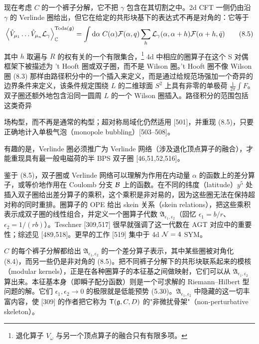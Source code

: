  现在考虑 $C$ 的一个裤子分解，它不把 $\gamma$ 包含在其切割之中。2d CFT 一侧仍由沿 $\gamma$ 的 Verlinde 圈给出，但它在给定的共形块基下的表达式不再是对角的：它等于
\begin{equation}
    \left\langle\hat V_{\mu_1}\ldots\hat V_{\mu_n}\mathcal{L}_\gamma\right\rangle^{\mathrm{Toda}(\mathfrak{g})}_{\mathbb{C}}
    =\int\mathrm{d}\alpha\;C(\alpha)\mathcal{F}(\alpha,q)\sum_h\mathcal{L}_\gamma(\alpha,\alpha+h)\mathcal{F}(\alpha+h,\bar q)
    \tag{8.5}
\end{equation}
其中 $h$ 取遍与 $R$ 的权有关的一个有限集合，\footnote{退化算子 $V_\omega$ 与另一个顶点算子的融合只有有限多项。} 4d 中相应的圈算子在这个 S 对偶框架下被描述为 't Hooft 圈或双子圈，而不是 Wilson 圈。't Hooft 圈不像 Wilson 圈 (8.3) 那样由路径积分中的一个插入来定义，而是通过给规范场强加一个奇异的边界条件来定义，该条件规定围绕 $L$ 的二维球面 $S^2$ 上具有非零的单极荷 $\frac{1}{2\pi}\int F$。双子圈还额外地包含沿同一圆周 $L$ 的一个 Wilson 圈插入。路径积分的范围包括这类奇异

场构型，而不再是通常的构型；超对称局域化仍然适用 [501]，并重现 (8.5)，只要正确地计入单极气泡（monopole bubbling）[503--508]。

有趣的是，Verlinde 圈必须推广为 Verlinde 网络（涉及退化顶点算子的融合），才能重现具有最一般电磁荷的半 BPS 双子圈 [46,51,52,516]。

 鉴于 (8.5)，双子圈或 Verlinde 网络可以理解为作用在内动量 $\alpha$ 的函数上的差分算子，或等价地作用在 Coulomb 分支 $\mathcal{B}$ 上的函数。在不同的纬度（latitude）$y^5$ 处插入双子圈给出差分算子的乘积，这个乘积是非对易的，因为这些圈无法在保持超对称的同时重排。圈算子的 OPE 给出 skein 关系（skein relations），把这些乘积表示成双子圈的线性组合，并定义一个圈算子代数 $\mathfrak{A}_{\epsilon_1,\epsilon_2}$（回忆 $\epsilon_1=b/r$、$\epsilon_2=1/(rb)$）。Teschner [309,517] 很早就强调了这一代数在 AGT 对应中的重要性；综述见 [489,518]。更早的工作 [519] 集中于 4d $\mathcal{N}=4$ SYM。

$C$ 的每个裤子分解都给出 $\mathfrak{A}_{\epsilon_1,\epsilon_2}$ 的一个差分算子表示，其中某些圈被对角化 (8.4)，而另一些仍是非对角的 (8.5)。把不同裤子分解下的共形块联系起来的模核（modular kernels），正是在各种圈算子的本征基之间做映射，它们可以从 $\mathfrak{A}_{\epsilon_1,\epsilon_2}$ 算出来。本征基本身（即瞬子配分函数）则是一个可求解的 Riemann--Hilbert 型问题的解。它们 $\epsilon_1,\epsilon_2\to0$ 的极限就是低能预势 (5.30)。$\mathfrak{A}_{\epsilon_1,\epsilon_2}$ 中隐藏的这一切丰富内容，使 [309] 的作者把它称为 $\mathsf{T}(\mathfrak{g},C,D)$ 的"非微扰骨架"（non-perturbative skeleton）。


